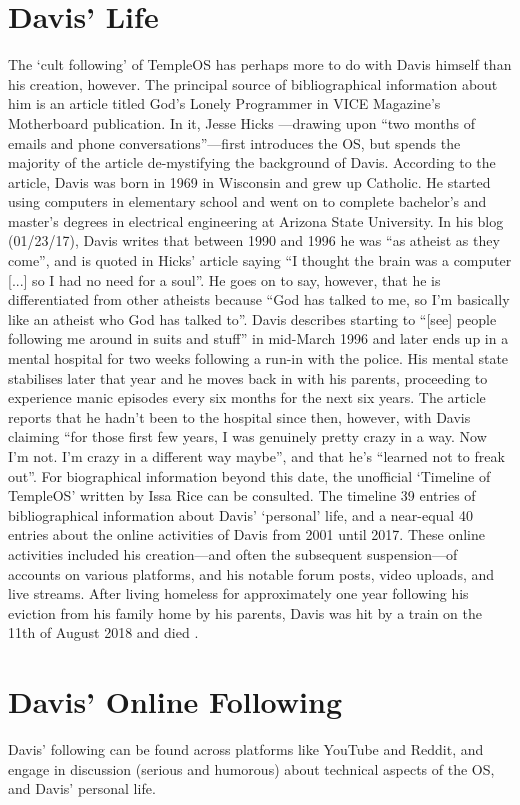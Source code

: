 \documentclass{article}
\begin{document}
\section*{Davis' Life}
The `cult following' of TempleOS has perhaps
more to do with Davis himself than his creation, however.
The principal source of bibliographical information about him is
an article titled God’s Lonely Programmer
in VICE Magazine’s Motherboard publication.
In it, Jesse Hicks \parencite*{Hicks14}---drawing
upon ``two months of emails and phone conversations''---first
introduces the OS,
but spends the majority of the article de-mystifying the background of Davis.
According to the article,
Davis was born in 1969 in Wisconsin and grew up Catholic.
He started using computers in elementary school
and went on to complete bachelor's and master's degrees
in electrical engineering at Arizona State University.
In his blog (01/23/17), Davis writes that
between 1990 and 1996 he was ``as atheist as they come'',
and is quoted in Hicks' article saying
``I thought the brain was a computer [...] so I had no need for a soul''.
He goes on to say, however, that he is differentiated from other atheists
because ``God has talked to me,
so I'm basically like an atheist who God has talked to''.
Davis describes starting to
``[see] people following me around in suits and stuff'' in mid-March 1996
and later ends up in a mental hospital for two weeks
following a run-in with the police.
His mental state stabilises later that year
and he moves back in with his parents,
proceeding to experience manic episodes every six months for the next six years.
The article reports that he hadn't been to the hospital since then, however,
with Davis claiming
``for those first few years, I was genuinely pretty crazy in a way.
Now I'm not. I'm crazy in a different way maybe'',
and that he's ``learned not to freak out''.
For biographical information beyond this date,
the unofficial `Timeline of TempleOS' written by Issa Rice
\parencite*{Rice18} can be consulted.
The timeline 39 entries of bibliographical information
about Davis' `personal' life, and a near-equal 40 entries about
the online activities of Davis from 2001 until 2017.
These online activities included his creation---and
often the subsequent suspension---of accounts on various platforms,
and his notable forum posts, video uploads, and live streams.
After living homeless for approximately one year following
his eviction from his family home by his parents,
Davis was hit by a train on the 11th of August 2018 and died \parencite{Cecil18}.

\section*{Davis' Online Following}
Davis' following can be found across platforms like YouTube and Reddit,
and engage in discussion (serious and humorous) about
technical aspects of the OS, and Davis’ personal life.

\printbibliography
\end{document}
